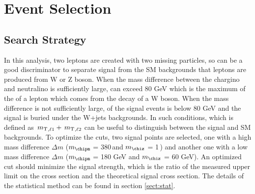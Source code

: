 \section{Event Selection}
\subsection{Search Strategy}
\label{sect:cuts}
In this analysis, two leptons are created with two missing particles, so \mttwo can be a good discriminator to separate signal 
from the SM backgrounds that leptons are produced from W or Z boson. When the mass difference between the chargino and neutralino 
is sufficiently large, \mttwo can exceed 80 GeV which is the maximum of the \mt of a lepton which comes from the decay of a W boson.
When the mass difference is not sufficiently large, \mttwo of the signal events is below 80 GeV and the signal is buried under the W+jets
backgrounds. In such conditions, \SumMT which is defined as $\,{m_{\rm T}}_{,\ell1} + \,{m_{\rm T}}_{,\ell2}$ can be useful to distinguish between the signal and 
SM backgrounds.
To optimize the cuts, two signal points are selected, one with a high mass difference 
$\Delta m$ ($m_{\chipm}$ = 380\,\GeV and $m_{\chiz}$ = 1\,\GeV) and another one with a low mass difference 
$\Delta m$ ($m_{\chipm}$ = 180 GeV and $m_{\chiz}$ = 60 GeV). An optimized cut should minimize the signal strength, 
which is the ratio of the measured upper limit on the cross section and the theoretical signal cross section. The details of the statistical 
method can be found in section \ref{sect:stat}.

